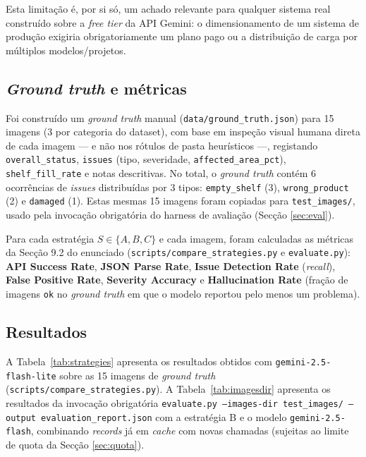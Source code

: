 \documentclass[conference]{IEEEtran}
\begin{document}
Esta limitação é, por si só, um achado relevante para qualquer sistema
real construído sobre a \textit{free tier} da API Gemini: o
dimensionamento de um sistema de produção exigiria obrigatoriamente um
plano pago ou a distribuição de carga por múltiplos modelos/projetos.

\subsection{\textit{Ground truth} e métricas}
\label{sec:ground-truth}
\label{sec:strategy-comparison}

Foi construído um \textit{ground truth} manual
(\texttt{data/ground\_truth.json}) para 15 imagens (3 por categoria do
dataset), com base em inspeção visual humana direta de cada imagem ---
e não nos rótulos de pasta heurísticos ---, registando
\texttt{overall\_status}, \texttt{issues} (tipo, severidade,
\texttt{affected\_area\_pct}), \texttt{shelf\_fill\_rate} e notas
descritivas. No total, o \textit{ground truth} contém 6 ocorrências de
\textit{issues} distribuídas por 3 tipos: \texttt{empty\_shelf} (3),
\texttt{wrong\_product} (2) e \texttt{damaged} (1). Estas mesmas 15 imagens
foram copiadas para \texttt{test\_images/}, usado pela invocação obrigatória
do harness de avaliação (Secção \ref{sec:eval}).

Para cada estratégia $S \in \{A, B, C\}$ e cada imagem, foram calculadas as
métricas da Secção 9.2 do enunciado (\texttt{scripts/compare\_strategies.py}
e \texttt{evaluate.py}): \textbf{API Success Rate}, \textbf{JSON Parse
Rate}, \textbf{Issue Detection Rate} (\textit{recall}), \textbf{False
Positive Rate}, \textbf{Severity Accuracy} e \textbf{Hallucination Rate}
(fração de imagens \texttt{ok} no \textit{ground truth} em que o modelo
reportou pelo menos um problema).

\subsection{Resultados}

A Tabela~\ref{tab:strategies} apresenta os resultados obtidos com
\texttt{gemini-2.5-flash-lite} sobre as 15 imagens de \textit{ground truth}
(\texttt{scripts/compare\_strategies.py}). A Tabela~\ref{tab:imagesdir}
apresenta os resultados da invocação obrigatória
\texttt{evaluate.py --images-dir test\_images/ --output evaluation\_report.json}
com a estratégia B e o modelo \texttt{gemini-2.5-flash}, combinando
\textit{records} já em \textit{cache} com novas chamadas (sujeitas ao
limite de quota da Secção \ref{sec:quota}).
\end{document}
